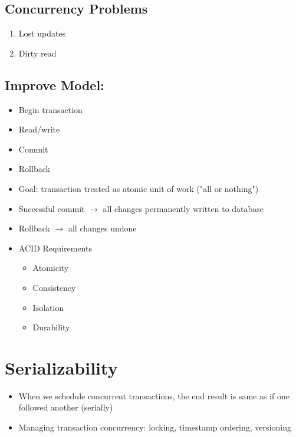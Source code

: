 \documentclass[12pt]{article}
\begin{document}
		\subsection*{Concurrency Problems}
		\begin{enumerate}
			\item
				Lost updates
			\item
				Dirty read
		\end{enumerate}
		\subsection*{Improve Model:}
			\begin{itemize}
				\item
					Begin transaction
				\item
					Read/write
				\item
					Commit
				\item
					Rollback
				\item
					Goal: transaction treated as atomic unit of work ("all or nothing")
				\item
					Successful commit $\rightarrow$ all changes permanently written to database
				\item
					Rollback $\rightarrow$ all changes undone
				\item
					ACID Requirements
					\begin{itemize}
						\item
							Atomicity
						\item
							Consistency
						\item
							Isolation
						\item
							Durability
					\end{itemize}
			\end{itemize}
	\section*{Serializability}
		\begin{itemize}
			\item
				When we schedule concurrent transactions, the end result is same as if one followed another (serially)
			\item
				Managing transaction concurrency: locking, timestamp ordering, versioning
		\end{itemize}
\end{document}
